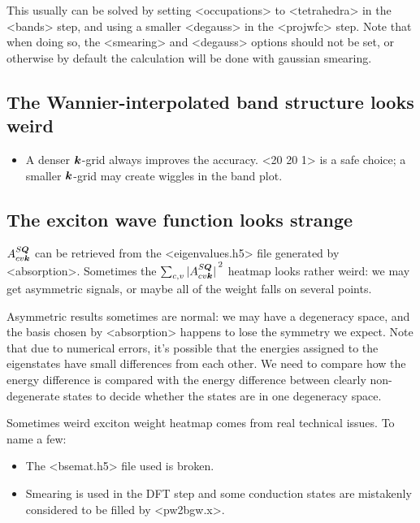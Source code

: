 \documentclass[hyperref, a4paper, 12pt]{report}
\def\texttt#1{<#1>}%
\newcommand{\shortcode}[1]{\texttt{#1}}
\begin{document}
This usually can be solved by 
setting \shortcode{occupations} to \shortcode{tetrahedra}
in the \shortcode{bands} step,
and using a smaller \shortcode{degauss} in the \shortcode{projwfc} step.
Note that when doing so, 
the \shortcode{smearing} and \shortcode{degauss} options 
should not be set, 
or otherwise by default the calculation will be done with gaussian smearing.

\subsection{The Wannier-interpolated band structure looks weird}

\begin{itemize}
    \item A denser $\vb*{k}$-grid always improves the accuracy. 
        \shortcode{20 20 1} is a safe choice; 
        a smaller $\vb*{k}$-grid may create wiggles in the band plot. 
\end{itemize}

\subsection{The exciton wave function looks strange} 

$A^{S\vb*{Q}}_{cv \vb*{k}}$ can be retrieved from 
the \shortcode{eigenvalues.h5} file generated by \shortcode{absorption}.
Sometimes the $\sum_{c, v} \abs*{A^{S \vb*{Q}}_{cv \vb*{k}}}^2$ 
heatmap looks rather weird: 
we may get asymmetric signals, 
or maybe all of the weight falls on several points. 

Asymmetric results sometimes are normal: 
we may have a degeneracy space, 
and the basis chosen by \shortcode{absorption} happens to 
lose the symmetry we expect. 
Note that due to numerical errors, 
it's possible that the energies assigned to the eigenstates 
have small differences from each other.
We need to compare how the energy difference is compared with the 
energy difference between clearly non-degenerate states 
to decide whether the states are in one degeneracy space. 

Sometimes weird exciton weight heatmap 
comes from real technical issues. To name a few: 
\begin{itemize}
    \item The \shortcode{bsemat.h5} file used is broken. 
    \item Smearing is used in the DFT step 
        and some conduction states are mistakenly considered to be filled 
        by \shortcode{pw2bgw.x}. 
\end{itemize}
\end{document}
